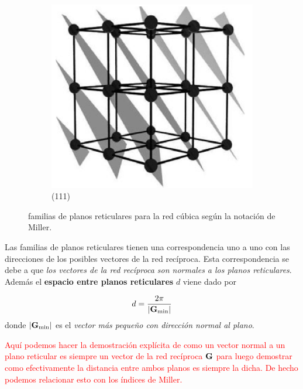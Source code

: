 \begin{figure}[h!]
	\begin{subfigure}{0.3\linewidth} \centering
	\includegraphics[scale=0.3]{Cuerpo/Ch_02/111.png}
	\caption{(111)}
	\end{subfigure}
	\caption{familias de planos reticulares para la red cúbica \sc según la notación de Miller.}
\end{figure}

Las familias de planos reticulares tienen una correspondencia uno a uno con las direcciones de los posibles vectores de la red recíproca. Esta correspondencia se debe a que \textit{los vectores de la red recíproca son normales a los planos reticulares}. Además el  \textbf{espacio entre planos reticulares} $d$ viene dado por 

\begin{equation}
	d = \frac{2\pi}{|\mathbf{G}_{\min}|} \label{Ec:02-01-06}
\end{equation}
donde $|\mathbf{G}_{\min}|$ es el \textit{vector más pequeño con dirección normal al plano}.

\begin{Anotacion}
	\textcolor{red}{Aquí podemos hacer la demostración explícita de como un vector normal a un plano reticular es siempre un vector de la red recíproca $\mathbf{G}$ para luego demostrar como efectivamente la distancia entre ambos planos es siempre la dicha. De hecho podemos relacionar esto con los índices de Miller.}
\end{Anotacion}


